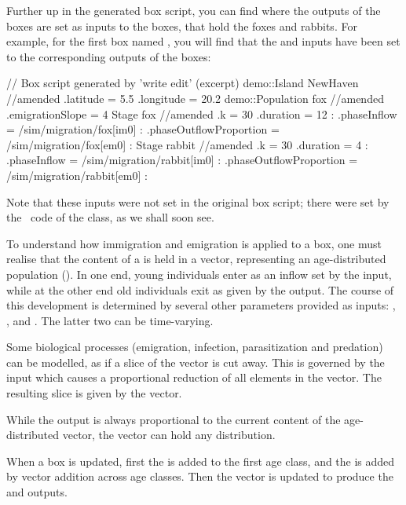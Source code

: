 Further up in the generated box script, you can find where the outputs of the  boxes are set as inputs to the  boxes, that hold the foxes and rabbits. For example, for the first  box named , you will find that the  and  inputs have been set to the corresponding outputs of the  boxes: 
\lstset{numbers=left}
\begin{boxscript}
// Box script generated by 'write edit' (excerpt)
demo::Island NewHaven{ //amended
	.latitude = 5.5
	.longitude = 20.2
	demo::Population fox{ //amended
		.emigrationSlope = 4
		Stage fox{ //amended
			.k = 30
			.duration = 12
			:
			.phaseInflow = /sim/migration/fox[im0]
			:
			.phaseOutflowProportion = /sim/migration/fox[em0]
			:
		}
		Stage rabbit{ //amended
			.k = 30
			.duration = 4
			:
			.phaseInflow = /sim/migration/rabbit[im0]
			:
			.phaseOutflowProportion = /sim/migration/rabbit[em0]
			:
		}
	}
}
\end{boxscript}
\lstset{numbers=none}

Note that these inputs were not set in the original box script; there were set by the \CPP\ code of the  class, as we shall soon see.

To understand how immigration and emigration is applied to a  box, one must realise that the content of a  is held in a vector, representing an age-distributed population (). In one end, young individuals enter as an inflow set by the  input, while at the other end old individuals exit as given by the  output. The course of this development is determined by several other parameters provided as inputs: , ,  and . The latter two can be time-varying.

Some biological processes (emigration, infection, parasitization and predation) can be modelled, as if a slice of the vector is cut away. This is governed by the  input which causes a proportional reduction of all elements in the vector. The resulting slice is given by the  vector.

While the  output is always proportional to the current content of the age-distributed vector, the  vector can hold any distribution. 

When a  box is updated, first the  is added to the first age class, and the  is added by vector addition across age classes. Then the vector is updated to produce the  and  outputs.

